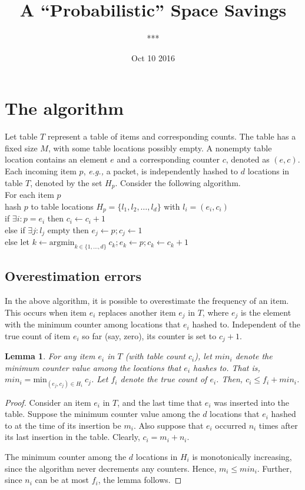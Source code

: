 \documentclass[10pt]{article}
\title{A ``Probabilistic'' Space Savings}
\author{***}
\date{Oct 10 2016}
\newtheorem{lemma}{Lemma}
\newcommand{\eg}{{\em e.g.,} }
\begin{document}
\maketitle

\section{The algorithm}

Let table $T$ represent a table of items and corresponding counts. The table has
a fixed size $M$, with some table locations possibly empty. A nonempty table
location contains an element $e$ and a corresponding counter $c$, denoted as
$(e,c)$. Each incoming item $p$, \eg a packet, is independently hashed to $d$
locations in table $T$, denoted by the set $H_p$. Consider the following
algorithm.\\

\noindent For each item $p$\\
hash $p$ to table locations $H_p = \{l_1, l_2, \ldots, l_d\}$ with $l_i = (e_i, c_i)$\\
if $\exists i: p = e_i$ then $c_i \leftarrow c_i + 1$\\
else if $\exists j: l_j$ empty then $e_j \leftarrow p; c_j \leftarrow 1$\\
else let $k \leftarrow \mathrm{arg min}_{k \in \{1,\ldots,d\}} \ c_k; e_k \leftarrow p; c_k \leftarrow c_k + 1$\\

\subsection{Overestimation errors}

In the above algorithm, it is possible to overestimate the frequency of an
item. This occurs when item $e_i$ replaces another item $e_j$ in $T$, where
$e_j$ is the element with the minimum counter among locations that $e_i$ hashed
to. Independent of the true count of item $e_i$ so far (say, zero), its counter
is set to $c_j + 1$.

\begin{lemma}
For any item $e_i$ in $T$ (with table count $c_i$), let $min_i$ denote the
minimum counter value among the locations that $e_i$ hashes to. That is, $min_i
= \mathrm{min}_{(e_j,c_j) \in H_i} \ c_j$. Let $f_i$ denote the true count of
$e_i$. Then, $c_i \leq f_i + min_i$.
\end{lemma}

\begin{proof}
Consider an item $e_i$ in $T$, and the last time that $e_i$ was inserted into
the table. Suppose the minimum counter value among the $d$ locations that $e_i$
hashed to at the time of its insertion be $m_i$. Also suppose that $e_i$
occurred $n_i$ times after its last insertion in the table. Clearly, $c_i = m_i
+ n_i$.

The minimum counter among the $d$ locations in $H_i$ is monotonically
increasing, since the algorithm never decrements any counters. Hence, $m_i \leq
min_i$. Further, since $n_i$ can be at most $f_i$, the lemma follows.
\end{proof}
\end{document}
